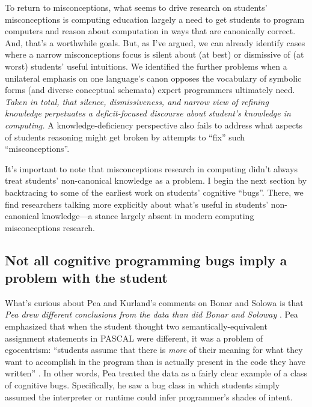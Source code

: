To return to misconceptions, what seems to drive research on students'
misconceptions is computing education largely a need to get students to program computers
and reason about computation in ways that are canonically correct. And,
that's a worthwhile goals. But, as I've argued, we can
already identify cases where a narrow misconceptions focus is silent
about (at best) or dismissive of (at worst) students' useful intuitions. We identified
the further problems when a unilateral emphasis on one language's canon
opposes the vocabulary of symbolic forms (and diverse conceptual
schemata) expert programmers ultimately need. \emph{Taken in
total, that silence, dismissiveness, and narrow view of refining
knowledge perpetuates a deficit-focused discourse about student's
knowledge in computing.} A knowledge-deficiency perspective also fails to address what aspects of
students reasoning might get broken by attempts to ``fix'' such
``misconceptions''.

It's important to note that misconceptions research in computing didn't
always treat students' non-canonical knowledge as a problem. I begin the
next section by backtracing to some of the earliest work on students'
cognitive ``bugs''. There, we find researchers talking more explicitly
about what's useful in students' non-canonical knowledge---a stance
largely absent in modern computing misconceptions research.

\subsection{Not all cognitive programming bugs imply a problem with
the
student}\label{not-all-cognitive-programming-bugs-imply-a-problem-with-the-student}

What's curious about Pea and Kurland's \cite{pea_languageindependent_1986} comments on Bonar and Solowa \cite{bonar_uncovering_1983} is
that \emph{Pea \cite{pea_languageindependent_1986} drew different conclusions from the data than did Bonar and Soloway
}. Pea emphasized that when the student thought two
semantically-equivalent assignment statements in PASCAL were different,
it was a problem of egocentrism: ``students assume that there is
\emph{more} of their meaning for what they want to accomplish in the
program than is actually present in the code they have written'' \cite{pea_languageindependent_1986}. In other words, Pea treated the data as a fairly clear example of a
class of cognitive bugs. Specifically, he saw a bug class in which students simply
assumed the interpreter or runtime could infer programmer's shades
of intent.

